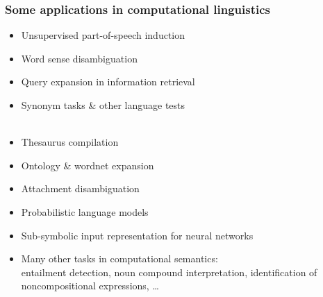 \documentclass[t]{beamer} %
\begin{document}
\begin{frame}
  \frametitle{Some applications in computational linguistics}

  \ungap
  \begin{itemize}
  \item Unsupervised part-of-speech induction \citep{Schuetze:95}
  \item Word sense disambiguation \citep{Schuetze:98}
  \item Query expansion in information retrieval \citep{Grefenstette:94}
  \item Synonym tasks \& other language tests\\\ \citep{Landauer:Dumais:97,Turney:etc:03}
  \item Thesaurus compilation \citep{Lin:98b,Rapp:04a}
  \item Ontology \& wordnet expansion \citep{Pantel:etc:09}
  \item Attachment disambiguation \citep*{Pantel:Lin:00}
  \item Probabilistic language models \citep{Bengio:etc:03b}
  \item Sub-symbolic input representation for neural networks
  \item Many other tasks in computational semantics:\\
    entailment detection, noun compound interpretation, identification
    of noncompositional expressions, \ldots
  \end{itemize}
\end{frame}
\end{document}
